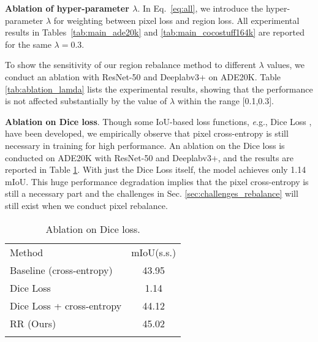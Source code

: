 \documentclass[final]{cvpr}
\begin{document}
\vspace{1mm}
\noindent\textbf{Ablation of hyper-parameter $\lambda$}.
In Eq.~\eqref{eq:all}, we introduce the hyper-parameter $\lambda$ for weighting between pixel loss and region loss. All experimental results in Tables~\ref{tab:main_ade20k} and \ref{tab:main_cocostuff164k} are reported for the same $\lambda=0.3$. 

To show the sensitivity of our region rebalance method to different $\lambda$ values, we conduct an ablation with ResNet-50 and Deeplabv3+ on ADE20K. Table \ref{tab:ablation_lamda} lists the experimental results, showing that the performance is not affected substantially by the value of $\lambda$ within the range [0.1,0.3].

\vspace{1mm}
\noindent\textbf{Ablation on Dice loss}.
Though some $\mathrm{IoU}$-based loss functions, {\textit e.g.}, Dice Loss \cite{milletari2016v}, have been developed, we empirically observe that pixel cross-entropy is still necessary in training for high performance. An ablation on the Dice loss is conducted on ADE$20$K with ResNet-50 and Deeplabv$3$+, and the results are reported in Table \ref{tab:ablation_dice}. With just the Dice Loss itself, the model achieves only 1.14 mIoU. This huge performance degradation implies that the pixel cross-entropy is still a necessary part and the challenges in Sec. \ref{sec:challenges_rebalance} will still exist when we conduct pixel rebalance. 


\begin{table}[t]
	\centering
	\setlength{\tabcolsep}{15pt}
	\caption{Ablation on Dice loss.}
	\label{tab:ablation_dice}
	{
		\begin{tabular}{l|c}
			\shline
			Method  &$\mathrm{mIoU}$(s.s.) \\
			\shline
			Baseline (cross-entropy)    &43.95 \\
			\shline
            Dice Loss                   &1.14 \\
            Dice Loss + cross-entropy   &44.12\\
			\shline
			RR (Ours)                   &45.02\\
			\shline
		\end{tabular}
	}
	\vspace{-0.15in}
\end{table}

\vspace{-0.1in}
\end{document}
